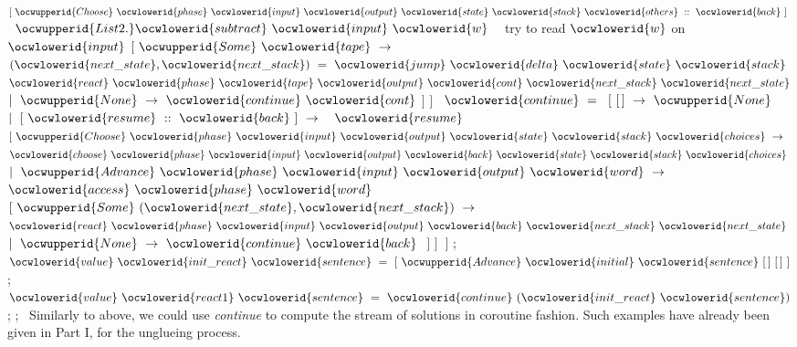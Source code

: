 \documentclass[12pt]{article}
\begin{document}
\ocwindent{9.00em}
~$[~\ocwupperid{Choose}~\ocwlowerid{phase}~\ocwlowerid{input}~\ocwlowerid{output}~\ocwlowerid{state}~\ocwlowerid{stack}~\ocwlowerid{others}~::~\ocwlowerid{back}~]~$\ocweol
\ocwindent{3.50em}
~$\ocwupperid{List2.}\ocwlowerid{subtract}~\ocwlowerid{input}~\ocwlowerid{w}~$~\ocwbc{} try to read \ocwbegindcode{}$\ocwlowerid{w}$\ocwenddcode{} on \ocwbegindcode{}$\ocwlowerid{input}$\ocwenddcode{} \ocwec{}\ocweol
\ocwindent{4.50em}
$[~\ocwupperid{Some}~\ocwlowerid{tape}~\rightarrow{}$\ocweol
\ocwindent{7.00em}
~$(\ocwlowerid{next\_state},\ocwlowerid{next\_stack})~=~\ocwlowerid{jump}~\ocwlowerid{delta}~\ocwlowerid{state}~\ocwlowerid{stack}~$\ocweol
\ocwindent{7.00em}
$\ocwlowerid{react}~\ocwlowerid{phase}~\ocwlowerid{tape}~\ocwlowerid{output}~\ocwlowerid{cont}~\ocwlowerid{next\_stack}~\ocwlowerid{next\_state}$\ocweol
\ocwindent{4.50em}
$\mid{}~\ocwupperid{None}~\rightarrow{}~\ocwlowerid{continue}~\ocwlowerid{cont}$\ocweol
\ocwindent{4.50em}
$]$\ocweol
\ocwindent{1.00em}
$]$\ocweol
\ocwindent{0.00em}
~$\ocwlowerid{continue}~=~$\ocweol
\ocwindent{1.00em}
$[~[\,]~\rightarrow{}~\ocwupperid{None}$\ocweol
\ocwindent{1.00em}
$\mid{}~[~\ocwlowerid{resume}~::~\ocwlowerid{back}~]~\rightarrow{}~$~$\ocwlowerid{resume}~$\ocweol
\ocwindent{3.00em}
$[~\ocwupperid{Choose}~\ocwlowerid{phase}~\ocwlowerid{input}~\ocwlowerid{output}~\ocwlowerid{state}~\ocwlowerid{stack}~\ocwlowerid{choices}~\rightarrow{}~$\ocweol
\ocwindent{5.00em}
$\ocwlowerid{choose}~\ocwlowerid{phase}~\ocwlowerid{input}~\ocwlowerid{output}~\ocwlowerid{back}~\ocwlowerid{state}~\ocwlowerid{stack}~\ocwlowerid{choices}~$\ocweol
\ocwindent{3.00em}
$\mid{}~\ocwupperid{Advance}~\ocwlowerid{phase}~\ocwlowerid{input}~\ocwlowerid{output}~\ocwlowerid{word}~\rightarrow{}~$~$\ocwlowerid{access}~\ocwlowerid{phase}~\ocwlowerid{word}~$\ocweol
\ocwindent{6.50em}
$[~\ocwupperid{Some}~(\ocwlowerid{next\_state},\ocwlowerid{next\_stack})~\rightarrow{}$\ocweol
\ocwindent{7.50em}
$\ocwlowerid{react}~\ocwlowerid{phase}~\ocwlowerid{input}~\ocwlowerid{output}~\ocwlowerid{back}~\ocwlowerid{next\_stack}~\ocwlowerid{next\_state}~$\ocweol
\ocwindent{6.50em}
$\mid{}~\ocwupperid{None}~\rightarrow{}~\ocwlowerid{continue}~\ocwlowerid{back}~$\ocweol
\ocwindent{6.50em}
$]$\ocweol
\ocwindent{3.00em}
$]~$\ocweol
\ocwindent{1.00em}
$]$\ocweol
\ocwindent{0.00em}
;\ocweol
\ocwindent{0.00em}
$\ocwlowerid{value}~\ocwlowerid{init\_react}~\ocwlowerid{sentence}~=~[~\ocwupperid{Advance}~\ocwlowerid{initial}~\ocwlowerid{sentence}~[\,]~[\,]~]$\ocweol
\ocwindent{0.00em}
;~\ocweol
\ocwindent{0.00em}
$\ocwlowerid{value}~\ocwlowerid{react1}~\ocwlowerid{sentence}~=~\ocwlowerid{continue}~(\ocwlowerid{init\_react}~\ocwlowerid{sentence})$\ocweol
\ocwindent{0.00em}
;\ocweol
\ocwindent{0.00em}
;~\ocweol
\ocweol
\ocwendcode{}Similarly to above, we could use {\sl continue} to compute
the stream of solutions in coroutine fashion. Such examples have already
been given in Part I, for the unglueing process.
\end{document}

